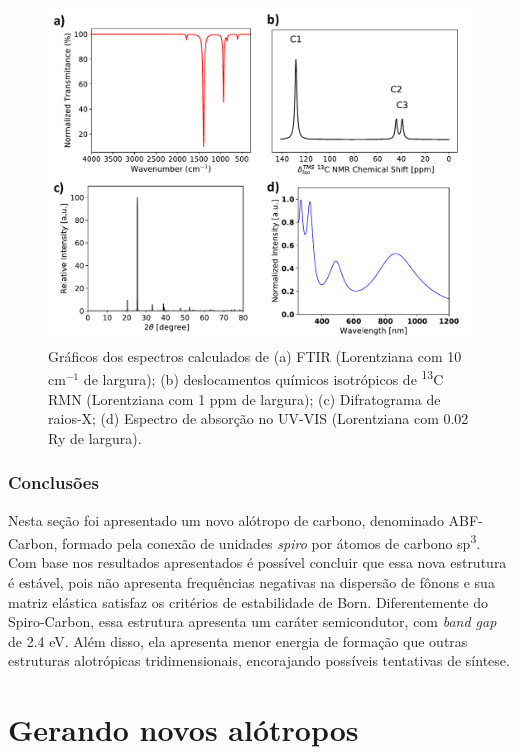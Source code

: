		\begin{figure}[!ht]
			\centering
			\includegraphics[width=1\linewidth]{capitulos/fig/results2/carac_ABF}
			\caption{Gráficos dos espectros calculados de (a) FTIR (Lorentziana com 10 cm$^{-1}$ de largura); (b) deslocamentos químicos isotrópicos de \textsuperscript{13}C RMN (Lorentziana com 1 ppm de largura); (c) Difratograma de raios-X; (d) Espectro de absorção no UV-VIS (Lorentziana com 0.02 Ry de largura).}
			\label{carac_abf}
		\end{figure}

	\subsection{Conclusões}
	
		Nesta seção foi apresentado um novo alótropo de carbono, denominado ABF-Carbon, formado pela conexão de unidades \textit{spiro} por átomos de carbono sp\textsuperscript{3}. Com base nos resultados apresentados é possível concluir que essa nova estrutura é estável, pois não apresenta frequências negativas na dispersão de fônons e sua matriz elástica satisfaz os critérios de estabilidade de Born. Diferentemente do Spiro-Carbon, essa estrutura apresenta um caráter semicondutor, com \textit{band gap} de 2.4 eV. Além disso, ela apresenta menor energia de formação que outras estruturas alotrópicas tridimensionais, encorajando possíveis tentativas de síntese.

\chapter{Gerando novos alótropos}
\label{alotropos_carbina}
	

